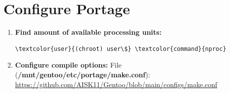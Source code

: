 \documentclass[10pt, a4paper, onecolumn, oneside, titlepage, openany]{book}
\begin{document}
\section{Configure Portage}
\begin{enumerate}
    \item \textbf{Find amount of available processing units:}
\begin{Verbatim}[commandchars=\\\{\}]
\textcolor{user}{(chroot) user\$} \textcolor{command}{nproc}
\end{Verbatim}
    \item \textbf{Configure compile options:}
\newline File (\textbf{\textcolor{file}{/mnt/gentoo/etc/portage/make.conf}}):
\newline \url{https://github.com/AISK11/Gentoo/blob/main/configs/make.conf}
\end{enumerate}
\end{document}
